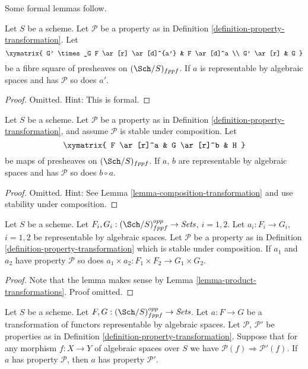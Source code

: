 \medskip\noindent
Some formal lemmas follow.

\begin{lemma}
\label{lemma-base-change-transformation-property}
Let $S$ be a scheme.
Let $\mathcal{P}$ be a property as in
Definition \ref{definition-property-transformation}.
Let
$$
\xymatrix{
G' \times_G F \ar[r] \ar[d]^{a'} & F \ar[d]^a \\
G' \ar[r] & G
}
$$
be a fibre square of presheaves on $(\Sch/S)_{fppf}$.
If $a$ is representable by algebraic spaces and has $\mathcal{P}$
so does $a'$.
\end{lemma}

\begin{proof}
Omitted. Hint: This is formal.
\end{proof}

\begin{lemma}
\label{lemma-composition-transformation-property}
Let $S$ be a scheme.
Let $\mathcal{P}$ be a property as in
Definition \ref{definition-property-transformation},
and assume $\mathcal{P}$ is stable under composition.
Let
$$
\xymatrix{
F \ar[r]^a & G \ar[r]^b & H
}
$$
be maps of presheaves on $(\Sch/S)_{fppf}$.
If $a$, $b$ are representable by algebraic spaces and has
$\mathcal{P}$ so does $b \circ a$.
\end{lemma}

\begin{proof}
Omitted. Hint: See
Lemma \ref{lemma-composition-transformation}
and use stability under composition.
\end{proof}

\begin{lemma}
\label{lemma-product-transformations-property}
Let $S$ be a scheme.
Let $F_i, G_i : (\Sch/S)_{fppf}^{opp} \to \textit{Sets}$,
$i = 1, 2$.
Let $a_i : F_i \to G_i$, $i = 1, 2$ be representable by algebraic spaces.
Let $\mathcal{P}$ be a property as in
Definition \ref{definition-property-transformation}
which is stable under composition.
If $a_1$ and $a_2$ have property $\mathcal{P}$ so does
$a_1 \times a_2 : F_1 \times F_2 \longrightarrow G_1 \times G_2$.
\end{lemma}

\begin{proof}
Note that the lemma makes sense by
Lemma \ref{lemma-product-transformations}.
Proof omitted.
\end{proof}

\begin{lemma}
\label{lemma-transformations-property-implication}
Let $S$ be a scheme.
Let $F, G : (\Sch/S)_{fppf}^{opp} \to \textit{Sets}$.
Let $a : F \to G$ be a transformation of functors representable by
algebraic spaces.
Let $\mathcal{P}$, $\mathcal{P}'$ be properties as in
Definition \ref{definition-property-transformation}.
Suppose that for any morphism $f : X \to Y$ of algebraic spaces over $S$
we have $\mathcal{P}(f) \Rightarrow \mathcal{P}'(f)$.
If $a$ has property $\mathcal{P}$, then
$a$ has property $\mathcal{P}'$.
\end{lemma}


